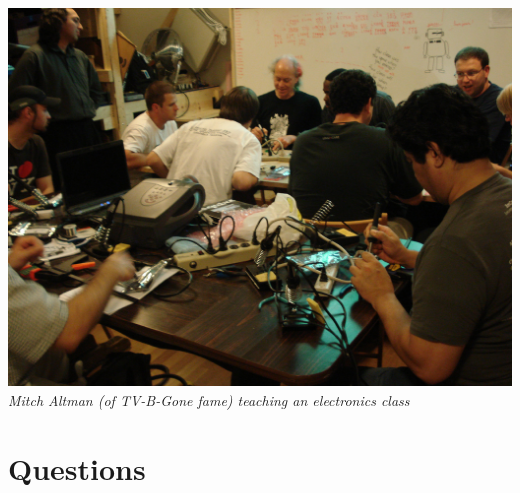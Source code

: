 \documentclass[notes]{beamer}
\begin{document}
\begin{frame}
  \begin{center}
  \includegraphics[height=.8\textheight]{mitch-teaching.jpg}\\
  {\small {\em Mitch Altman (of TV-B-Gone fame) teaching an electronics class}}
\end{center}
\end{frame}


\section{Questions}
\end{document}
